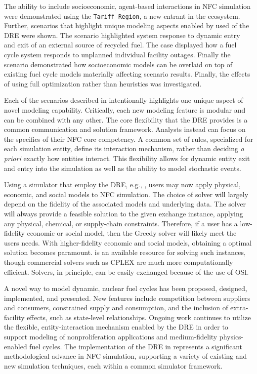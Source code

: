 The ability to include socioeconomic, agent-based interactions in NFC simulation
were demonstrated using the \texttt{Tariff Region}, a new entrant in the \Cyclus
ecosystem. Further, scenarios that highlight unique modeling aspects enabled by
used of the DRE were shown. The \external scenario highlighted system response
to dynamic entry and exit of an external source of recycled fuel. The \outage
case displayed how a fuel cycle system responds to unplanned individual facility
outages. Finally the \tariff scenario demonstrated how socioeconomic models can
be overlaid on top of existing fuel cycle models materially affecting scenario
results. Finally, the effects of using full optimization rather than heuristics
was investigated.

Each of the scenarios described in  intentionally highlights
one unique aspect of novel modeling capability. Critically, each new modeling
feature is modular and can be combined with any other. The core flexibility that
the DRE provides is a common communication and solution framework. Analysts
instead can focus on the specifics of their NFC core competency. A common set of
rules, specialized for each simulation entity, define its interaction mechanism,
rather than deciding \textit{a priori} exactly how entities interact. This
flexibility allows for dynamic entity exit and entry into the simulation as well
as the ability to model stochastic events.

Using a simulator that employ the DRE, e.g., \Cyclus, users may now apply
physical, economic, and social models to NFC simulation. The choice of solver
will largely depend on the fidelity of the associated models and underlying
data. The \greedy solver will always provide a feasible solution to the given
exchange instance, applying any physical, chemical, or supply-chain
constraints. Therefore, if a user has a low-fidelity economic or social model,
then the Greedy solver will likely meet the users needs. With higher-fidelity
economic and social models, obtaining a optimal solution becomes paramount. \cbc
is an available resource for solving such instances, though commercial solvers
such as CPLEX are much more computationally efficient. Solvers, in principle,
can be easily exchanged because of the use of OSI.

A novel way to model dynamic, nuclear fuel cycles has been proposed, designed,
implemented, and presented. New features include competition between suppliers
and consumers, constrained supply and consumption, and the inclusion of
extra-facility effects, such as state-level relationships. Ongoing work
continues to utilize the flexible, entity-interaction mechanism enabled by the
DRE in order to support modeling of nonproliferation applications and
medium-fidelity physics-enabled fuel cycles. The implementation of the DRE in
\Cyclus represents a significant methodological advance in NFC simulation,
supporting a variety of existing and new simulation techniques, each within a
common simulator framework.
